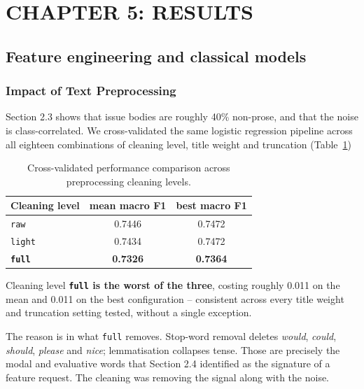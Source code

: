 
\section*{CHAPTER 5: RESULTS}
\setcounter{section}{5}
\setcounter{subsection}{0}
\setcounter{figure}{0}
\setcounter{table}{0}

\subsection{Feature engineering and classical models}

\subsubsection{Impact of Text Preprocessing}

Section 2.3 shows that issue bodies are roughly 40\% non-prose, and that the noise is class-correlated. We cross-validated the same logistic regression pipeline across all eighteen combinations of cleaning level, title weight and truncation (Table~\ref{tab:cleaning_ablation})

\begin{table}[H]
\centering
\caption{Cross-validated performance comparison across preprocessing cleaning levels.}
\label{tab:cleaning_ablation}
\vspace{0.5em}
\begin{tabular}{l c c}
\hline
Cleaning level & mean macro F1 & best macro F1 \\
\hline
\texttt{raw} & 0.7446 & 0.7472 \\
\texttt{light} & 0.7434 & 0.7472 \\
\textbf{\texttt{full}} & \textbf{0.7326} & \textbf{0.7364} \\
\hline
\end{tabular}
\end{table}

Cleaning level \textbf{\texttt{full} is the worst of the three}, costing roughly 0.011 on the mean and 0.011 on the best configuration -- consistent across every title weight and truncation setting tested, without a single exception.

The reason is in what \texttt{full} removes. Stop-word removal deletes \textit{would}, \textit{could}, \textit{should}, \textit{please} and \textit{nice}; lemmatisation collapses tense. Those are precisely the modal and evaluative words that Section 2.4 identified as the signature of a feature request. The cleaning was removing the signal along with the noise.

